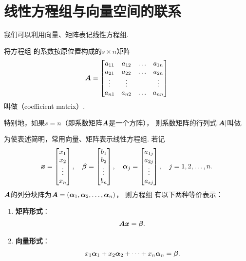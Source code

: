 \section{线性方程组与向量空间的联系}
我们可以利用向量、矩阵表记线性方程组.

\begin{definition}
将方程组  的系数按原位置构成的\(s \times n\)矩阵\begin{equation*}
	\boldsymbol{A} = \begin{bmatrix}
		a_{11} & a_{12} & \dots & a_{1n} \\
		a_{21} & a_{22} & \dots & a_{2n} \\
		\vdots & \vdots & & \vdots \\
		a_{n1} & a_{n2} & \dots & a_{nn}
	\end{bmatrix}
\end{equation*}叫做（coefficient matrix）.

特别地，如果\(s = n\)（即系数矩阵\(\boldsymbol{A}\)是一个方阵），
则系数矩阵的行列式\(\abs{\boldsymbol{A}}\)叫做.
\end{definition}

为使表述简明，常用向量、矩阵表示线性方程组.
若记\begin{equation*}
	\boldsymbol{x}=\begin{bmatrix}
		x_1 \\ x_2 \\ \vdots \\ x_n
	\end{bmatrix},
	\quad
	\boldsymbol\beta=\begin{bmatrix}
		b_1 \\ b_2 \\ \vdots \\ b_n
	\end{bmatrix},
	\quad
	\boldsymbol\alpha_j=\begin{bmatrix}
		a_{1j} \\ a_{2j} \\ \vdots \\ a_{sj}
	\end{bmatrix},
	\quad
	j=1,2,\dotsc,n.
\end{equation*}
\(\boldsymbol{A}\)的列分块阵为\(\boldsymbol{A} = (\boldsymbol\alpha_1,\boldsymbol\alpha_2,\dotsc,\boldsymbol\alpha_n)\)，
则方程组  有以下两种等价表示：
\begin{enumerate}
	\item {\rm\bf 矩阵形式}：
	\begin{equation}
		\boldsymbol{A} \boldsymbol{x} = \boldsymbol\beta.
	\end{equation}
	\item {\rm\bf 向量形式}：
	\begin{equation}
		x_1 \boldsymbol\alpha_1 + x_2 \boldsymbol\alpha_2 + \dotsb + x_n \boldsymbol\alpha_n = \boldsymbol\beta.
	\end{equation}
\end{enumerate}
